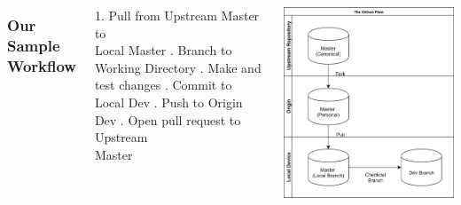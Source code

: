 \documentclass[unknownkeysallowed]{beamer}
\begin{document}
\begin{frame}
    \vspace{1cm}
	\begin{columns}
		\column{2.5in}
    \frametitle{Our Sample Workflow}
        1. Pull from Upstream Master to \\
        Local Master \linebreak{}. Branch to Working Directory \linebreak{}. Make and test changes \linebreak{}. Commit to Local Dev \linebreak{}. Push to Origin Dev \linebreak{}. Open pull request to Upstream \\
        Master
	\column{2.25in}
	\begin{center}
	\includegraphics[width = .9\linewidth]{assets/gitflow4}
	\end{center}
	\end{columns}
    \vspace{1cm}
\end{frame}
\end{document}
